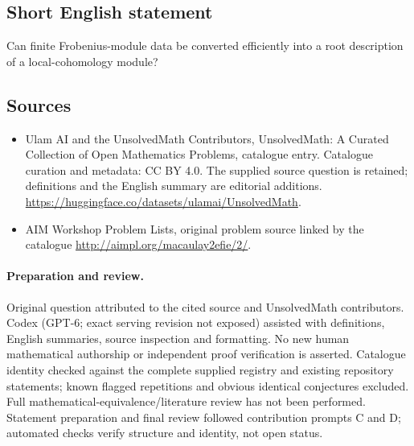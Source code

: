\documentclass[11pt]{article}
\begin{document}
\subsection{Short English statement}
Can finite Frobenius-module data be converted efficiently into a root description of a local-cohomology module?
\subsection{Sources}
\begin{itemize}
\item[\hypertarget{source:statement:1}{S1}] Ulam AI and the UnsolvedMath Contributors, UnsolvedMath: A Curated Collection of Open Mathematics Problems, catalogue entry. Catalogue curation and metadata: CC BY 4.0. The supplied source question is retained; definitions and the English summary are editorial additions.
\url{https://huggingface.co/datasets/ulamai/UnsolvedMath}.
\item[\hypertarget{source:statement:2}{S2}] AIM Workshop Problem Lists, original problem source linked by the catalogue
\url{http://aimpl.org/macaulay2efie/2/}.
\end{itemize}
\paragraph{Preparation and review.}
Original question attributed to the cited source and UnsolvedMath contributors. Codex (GPT-6; exact serving revision not exposed) assisted with definitions, English summaries, source inspection and formatting. No new human mathematical authorship or independent proof verification is asserted. Catalogue identity checked against the complete supplied registry and existing repository statements; known flagged repetitions and obvious identical conjectures excluded. Full mathematical-equivalence/literature review has not been performed. Statement preparation and final review followed contribution prompts C and D; automated checks verify structure and identity, not open status.
\label{end:statement}
\end{document}
